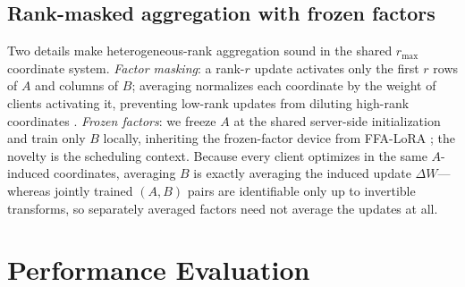 \documentclass[conference]{IEEEtran}
\begin{document}
\subsection{Rank-masked aggregation with frozen factors}
\label{sec:aggregation}
Two details make heterogeneous-rank aggregation sound in the shared $r_{\max}$ coordinate system. \emph{Factor masking}: a rank-$r$ update activates only the first $r$ rows of $A$ and columns of $B$; averaging normalizes each coordinate by the weight of clients activating it, preventing low-rank updates from diluting high-rank coordinates \cite{wang2024flora,babakniya2023slora}. \emph{Frozen factors}: we freeze $A$ at the shared server-side initialization and train only $B$ locally, inheriting the frozen-factor device from FFA-LoRA \cite{sun2024ffalora}; the novelty is the scheduling context. Because every client optimizes in the same $A$-induced coordinates, averaging $B$ is exactly averaging the induced update $\Delta W$---whereas jointly trained $(A,B)$ pairs are identifiable only up to invertible transforms, so separately averaged factors need not average the updates at all. 

\section{Performance Evaluation}
\label{sec:eval}
\end{document}
